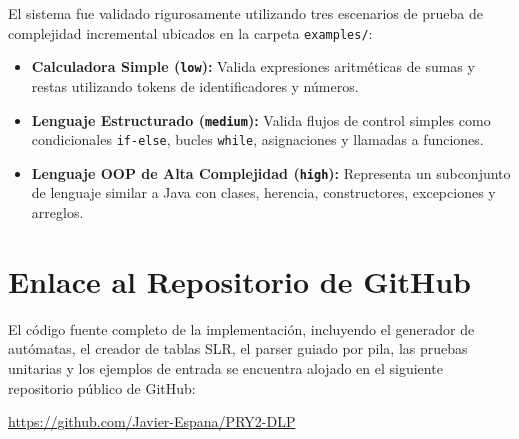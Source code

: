 \documentclass[12pt,letterpaper]{article}
\begin{document}
El sistema fue validado rigurosamente utilizando tres escenarios de prueba de complejidad incremental ubicados en la carpeta \texttt{examples/}:
\begin{itemize}
    \item \textbf{Calculadora Simple (\texttt{low}):} Valida expresiones aritméticas de sumas y restas utilizando tokens de identificadores y números.
    \item \textbf{Lenguaje Estructurado (\texttt{medium}):} Valida flujos de control simples como condicionales \texttt{if-else}, bucles \texttt{while}, asignaciones y llamadas a funciones.
    \item \textbf{Lenguaje OOP de Alta Complejidad (\texttt{high}):} Representa un subconjunto de lenguaje similar a Java con clases, herencia, constructores, excepciones y arreglos.
\end{itemize}

\section{Enlace al Repositorio de GitHub}

El código fuente completo de la implementación, incluyendo el generador de autómatas, el creador de tablas SLR, el parser guiado por pila, las pruebas unitarias y los ejemplos de entrada se encuentra alojado en el siguiente repositorio público de GitHub:

\begin{center}
    \url{https://github.com/Javier-Espana/PRY2-DLP}
\end{center}
\end{document}
